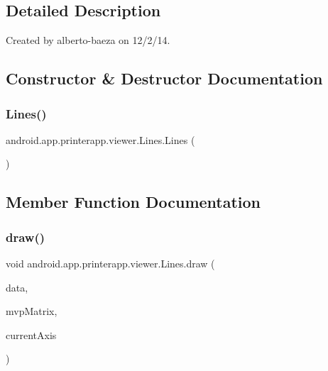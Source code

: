 \subsection{Detailed Description}
Created by alberto-\/baeza on 12/2/14. 

\subsection{Constructor \& Destructor Documentation}
\mbox{\label{classandroid_1_1app_1_1printerapp_1_1viewer_1_1_lines_aec7c4103762805af4cb237efc213af5e}} 
\subsubsection{\texorpdfstring{Lines()}{Lines()}}
{\footnotesize\ttfamily android.\+app.\+printerapp.\+viewer.\+Lines.\+Lines (\begin{DoxyParamCaption}{ }\end{DoxyParamCaption})}



\subsection{Member Function Documentation}
\mbox{\label{classandroid_1_1app_1_1printerapp_1_1viewer_1_1_lines_a668b681901515b4d14e85954ef890974}} 
\subsubsection{\texorpdfstring{draw()}{draw()}}
{\footnotesize\ttfamily void android.\+app.\+printerapp.\+viewer.\+Lines.\+draw (\begin{DoxyParamCaption}\item[{\hyperlink{classandroid_1_1app_1_1printerapp_1_1viewer_1_1_data_storage}{Data\+Storage}}]{data,  }\item[{float \mbox{[}$\,$\mbox{]}}]{mvp\+Matrix,  }\item[{int}]{current\+Axis }\end{DoxyParamCaption})}



